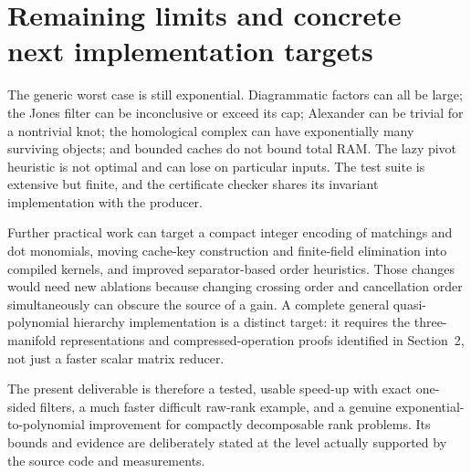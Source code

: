 \documentclass[11pt,letterpaper]{article}
\theoremstyle{definition}\newtheorem{definition}[theorem]{Definition}
\theoremstyle{remark}\newtheorem{remark}[theorem]{Remark}
\begin{document}
\section{Remaining limits and concrete next implementation targets}

The generic worst case is still exponential. Diagrammatic factors can all be
large; the Jones filter can be inconclusive or exceed its cap; Alexander can be
trivial for a nontrivial knot; the homological complex can have exponentially
many surviving objects; and bounded caches do not bound total RAM. The lazy
pivot heuristic is not optimal and can lose on particular inputs. The test suite
is extensive but finite, and the certificate checker shares its invariant
implementation with the producer.

Further practical work can target a compact integer encoding of matchings and
dot monomials, moving cache-key construction and finite-field elimination into
compiled kernels, and improved separator-based order heuristics. Those changes
would need new ablations because changing crossing order and cancellation order
simultaneously can obscure the source of a gain. A complete general
quasi-polynomial hierarchy implementation is a distinct target: it requires the
three-manifold representations and compressed-operation proofs identified in
Section~2, not just a faster scalar matrix reducer.

The present deliverable is therefore a tested, usable speed-up with exact
one-sided filters, a much faster difficult raw-rank example, and a genuine
exponential-to-polynomial improvement for compactly decomposable rank problems.
Its bounds and evidence are deliberately stated at the level actually supported
by the source code and measurements.
\end{document}
